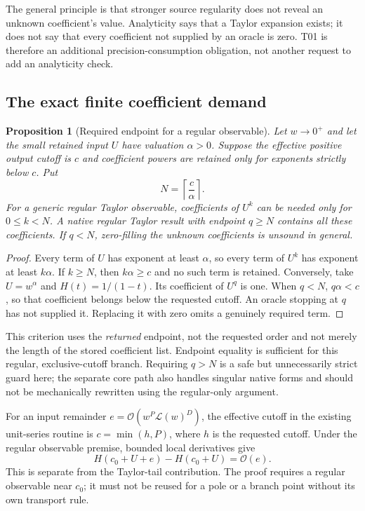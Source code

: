 \documentclass[11pt,letterpaper]{article}
\newcommand{\OO}{\mathcal{O}}
\newcommand{\LL}{\mathcal{L}}
\newtheorem{proposition}{Proposition}[section]
\theoremstyle{definition}\newtheorem{definition}[proposition]{Definition}
\begin{document}
The general principle is that stronger source regularity does not reveal an
unknown coefficient's value. Analyticity says that a Taylor expansion exists;
it does not say that every coefficient not supplied by an oracle is zero.
T01 is therefore an additional precision-consumption obligation, not another
request to add an analyticity check.

\subsection{The exact finite coefficient demand}
\begin{proposition}[Required endpoint for a regular observable]\label{prop:demand}
Let $w\to0^+$ and let the small retained input $U$ have valuation $\alpha>0$.
Suppose the effective positive output cutoff is $c$ and coefficient powers are
retained only for exponents strictly below $c$. Put
\begin{equation}\label{eq:demand}
 N=\left\lceil\frac{c}{\alpha}\right\rceil.
\end{equation}
For a generic regular Taylor observable, coefficients of $U^k$ can be needed
only for $0\le k<N$. A native regular Taylor result with endpoint $q\ge N$
contains all these coefficients. If $q<N$, zero-filling the unknown coefficients
is unsound in general.
\end{proposition}
\begin{proof}
Every term of $U$ has exponent at least $\alpha$, so every term of $U^k$ has
exponent at least $k\alpha$. If $k\ge N$, then $k\alpha\ge c$ and no such term
is retained. Conversely, take $U=w^\alpha$ and $H(t)=1/(1-t)$. Its coefficient
of $U^q$ is one. When $q<N$, $q\alpha<c$, so that coefficient belongs below
the requested cutoff. An oracle stopping at $q$ has not supplied it. Replacing
it with zero omits a genuinely required term.
\end{proof}

This criterion uses the \emph{returned} endpoint, not the requested order and
not merely the length of the stored coefficient list. Endpoint equality is
sufficient for this regular, exclusive-cutoff branch. Requiring $q>N$ is a
safe but unnecessarily strict guard here; the separate core path also handles
singular native forms and should not be mechanically rewritten using the
regular-only argument.

For an input remainder
$e=\OO(w^P\LL(w)^D)$, the effective cutoff in the existing unit-series routine
is $c=\min(h,P)$, where $h$ is the requested cutoff. Under the regular observable
premise, bounded local derivatives give
\begin{equation}
 H(c_0+U+e)-H(c_0+U)=\OO(e).
\end{equation}
This is separate from the Taylor-tail contribution. The proof requires a
regular observable near $c_0$; it must not be reused for a pole or a branch point
without its own transport rule.
\end{document}
